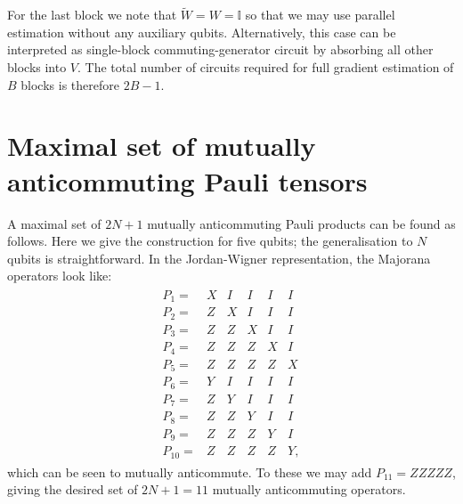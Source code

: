\documentclass[a4paper,twocolumn,11pt]{quantumarticle}
\begin{document}
For the last block we note that $\tilde{W}=W=\mathbb{I}$ so that we may use parallel estimation without any auxiliary qubits. Alternatively, this case can be interpreted as single-block commuting-generator circuit by absorbing all other blocks into $V$. The total number of circuits required for full gradient estimation of $B$ blocks is therefore $2B-1$.

\section{Maximal set of mutually anticommuting Pauli tensors}\label{app:maj}
A maximal set of $2N+1$ mutually anticommuting Pauli products can be found as follows. Here we give the construction for five qubits; the generalisation to $N$ qubits is straightforward. In the Jordan-Wigner representation, the Majorana operators look like:
%
\begin{align}
\begin{matrix}
    P_1 = & X&I&I&I&I \\
    P_2 = &Z&X&I&I&I \\
    P_3 = &Z&Z&X&I&I \\
    P_4 = &Z&Z&Z&X&I \\
    P_5 = &Z&Z&Z&Z&X \\
    P_6 = &Y&I&I&I&I \\
    P_7 = &Z&Y&I&I&I \\
    P_8 = &Z&Z&Y&I&I \\
    P_9 = &Z&Z&Z&Y&I \\
    P_{10} = &Z&Z&Z&Z&Y,
\end{matrix}
\end{align}
which can be seen to mutually anticommute. To these we may add $P_{11}=ZZZZZ$, giving the desired set of $2N+1=11$ mutually anticommuting operators. 
\end{document}
